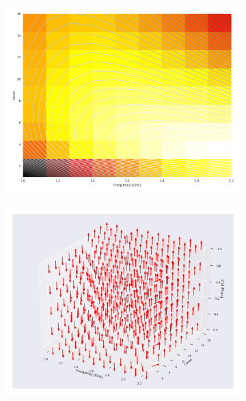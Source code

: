 \begin{figure}[H]
	\centering
	\begin{subfigure}[b]{0.45\textwidth}
		\includegraphics[width=\textwidth]{models/figures/analisys/pdyn3.png}
	\end{subfigure}
	\begin{subfigure}[b]{0.45\textwidth}
		\includegraphics[width=\textwidth]{models/figures/analisys/pdyn3_3d.png}
	\end{subfigure}
\end{figure}

